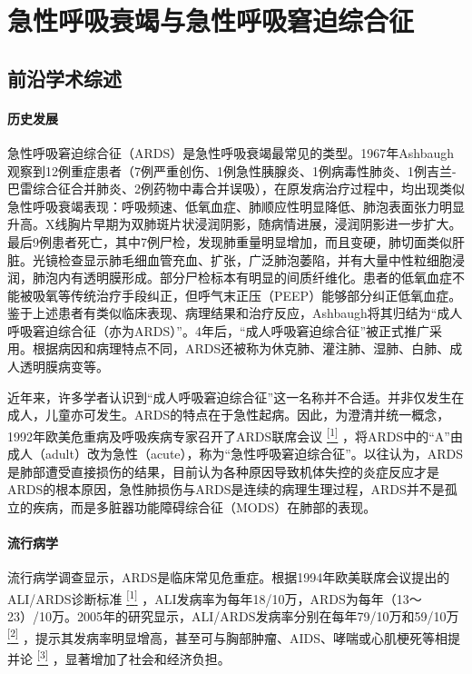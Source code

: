 \chapter{急性呼吸衰竭与急性呼吸窘迫综合征}

\section{前沿学术综述}

\subsubsection{历史发展}

急性呼吸窘迫综合征（ARDS）是急性呼吸衰竭最常见的类型。1967年Ashbaugh观察到12例重症患者（7例严重创伤、1例急性胰腺炎、1例病毒性肺炎、1例吉兰-巴雷综合征合并肺炎、2例药物中毒合并误吸），在原发病治疗过程中，均出现类似急性呼吸衰竭表现：呼吸频速、低氧血症、肺顺应性明显降低、肺泡表面张力明显升高。X线胸片早期为双肺斑片状浸润阴影，随病情进展，浸润阴影进一步扩大。最后9例患者死亡，其中7例尸检，发现肺重量明显增加，而且变硬，肺切面类似肝脏。光镜检查显示肺毛细血管充血、扩张，广泛肺泡萎陷，并有大量中性粒细胞浸润，肺泡内有透明膜形成。部分尸检标本有明显的间质纤维化。患者的低氧血症不能被吸氧等传统治疗手段纠正，但呼气末正压（PEEP）能够部分纠正低氧血症。鉴于上述患者有类似临床表现、病理结果和治疗反应，Ashbaugh将其归结为“成人呼吸窘迫综合征（亦为ARDS）”。4年后，“成人呼吸窘迫综合征”被正式推广采用。根据病因和病理特点不同，ARDS还被称为休克肺、灌注肺、湿肺、白肺、成人透明膜病变等。

近年来，许多学者认识到“成人呼吸窘迫综合征”这一名称并不合适。并非仅发生在成人，儿童亦可发生。ARDS的特点在于急性起病。因此，为澄清并统一概念，1992年欧美危重病及呼吸疾病专家召开了ARDS联席会议
\protect\hyperlink{text00011.htmlux5cux23ch1-10}{\textsuperscript{{[}1{]}}}
，将ARDS中的“A”由成人（adult）改为急性（acute），称为“急性呼吸窘迫综合征”。以往认为，ARDS是肺部遭受直接损伤的结果，目前认为各种原因导致机体失控的炎症反应才是ARDS的根本原因，急性肺损伤与ARDS是连续的病理生理过程，ARDS并不是孤立的疾病，而是多脏器功能障碍综合征（MODS）在肺部的表现。

\subsubsection{流行病学}

流行病学调查显示，ARDS是临床常见危重症。根据1994年欧美联席会议提出的ALI/ARDS诊断标准
\protect\hyperlink{text00011.htmlux5cux23ch1-10}{\textsuperscript{{[}1{]}}}
，ALI发病率为每年18/10万，ARDS为每年（13～23）/10万。2005年的研究显示，ALI/ARDS发病率分别在每年79/10万和59/10万
\protect\hyperlink{text00011.htmlux5cux23ch2-10}{\textsuperscript{{[}2{]}}}
，提示其发病率明显增高，甚至可与胸部肿瘤、AIDS、哮喘或心肌梗死等相提并论
\protect\hyperlink{text00011.htmlux5cux23ch3-10}{\textsuperscript{{[}3{]}}}
，显著增加了社会和经济负担。

